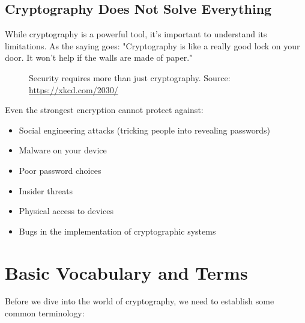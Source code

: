\documentclass[11pt,a4paper]{report}
\begin{document}
\subsection{Cryptography Does Not Solve Everything}

While cryptography is a powerful tool, it's important to understand its limitations. As the saying goes: "Cryptography is like a really good lock on your door. It won't help if the walls are made of paper."

\begin{figure}[h]
\caption{Security requires more than just cryptography. Source: \url{https://xkcd.com/2030/}}
\end{figure}

Even the strongest encryption cannot protect against:
\begin{itemize}
\item Social engineering attacks (tricking people into revealing passwords)
\item Malware on your device
\item Poor password choices
\item Insider threats
\item Physical access to devices
\item Bugs in the implementation of cryptographic systems
\end{itemize}

\newpage
\section{Basic Vocabulary and Terms}

Before we dive into the world of cryptography, we need to establish some common terminology:
\end{document}
